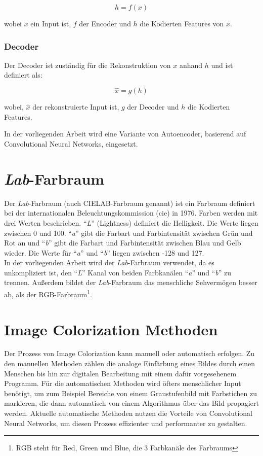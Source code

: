 \begin{equation}
  h = f(x)
\end{equation}

wobei $x$ ein Input ist, $f$ der Encoder und $h$ die Kodierten Features von $x$.

\subsubsection{Decoder}
Der Decoder ist zuständig für die Rekonstruktion von $x$ anhand $h$ und ist definiert als:

\begin{equation}
  \hat{x} = g(h)
\end{equation}

wobei, $\hat{x}$ der rekonstruierte Input ist, $g$ der Decoder und $h$ die Kodierten Features.

In der vorliegenden Arbeit wird eine Variante von Autoencoder, basierend auf Convolutional Neural Networks, eingesetzt.

\section{\textit{Lab}-Farbraum} 
Der \textit{Lab}-Farbraum (auch CIELAB-Farbraum genannt) ist ein Farbraum definiert bei der internationalen
Beleuchtungskommission (\gls{cie}) in 1976. Farben werden mit drei Werten beschrieben. ``\textit{L}'' (Lightness) definiert die Helligkeit.
Die Werte liegen zwischen 0 und 100. ``\textit{a}'' gibt die Farbart und Farbintensität zwischen Grün und Rot an und ``\textit{b}'' gibt die
Farbart und Farbintensität zwischen Blau und Gelb wieder. Die Werte für ``\textit{a}'' und ``\textit{b}'' liegen zwischen -128 und 127.
\\
In der vorliegenden Arbeit wird der \textit{Lab}-Farbraum verwendet, da es unkompliziert ist, den ``\textit{L}'' Kanal von beiden Farbkanälen
``\textit{a}'' und ``\textit{b}'' zu trennen. Außerdem bildet der \textit{Lab}-Farbraum das menschliche Sehvermögen besser ab, als der 
RGB-Farbraum\footnote{RGB steht für Red, Green und Blue, die 3 Farbkanäle des Farbraums}.

\section{Image Colorization Methoden}
Der Prozess von Image Colorization kann manuell oder automatisch erfolgen. Zu den manuellen Methoden zählen die analoge Einfärbung eines Bildes
durch einen Menschen bis hin zur digitalen Bearbeitung mit einem dafür vorgesehenem Programm. Für die automatischen Methoden wird öfters menschlicher Input
benötigt, um zum Beispiel Bereiche von einem Graustufenbild mit Farbstichen zu markieren, die dann automatisch von einem Algorithmus über das Bild
propagiert werden. Aktuelle automatische Methoden nutzen die Vorteile von Convolutional Neural Networks, um diesen Prozess effizienter und performanter
zu gestalten.

